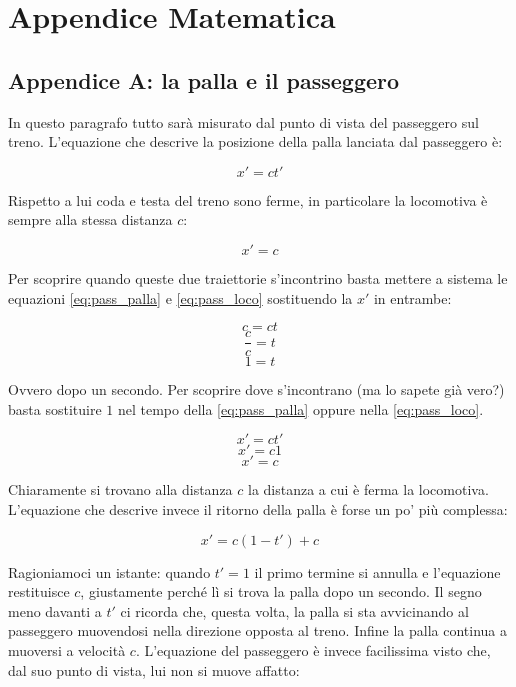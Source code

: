 ﻿\appendix


\chapter{Appendice Matematica}

\section{Appendice A: la palla e il passeggero}

In questo paragrafo tutto sarà misurato dal punto di vista del passeggero sul treno. L'equazione che descrive la posizione della palla lanciata dal passeggero è:

\begin{equation} \label{eq:pass_palla} 
  x'= ct'
\end{equation}

Rispetto a lui coda e testa del treno sono ferme, in particolare la locomotiva è sempre alla stessa distanza $c$:

\begin{equation} \label{eq:pass_loco} 
  x'= c
\end{equation}

Per scoprire quando queste due traiettorie s'incontrino basta mettere a sistema le equazioni \ref{eq:pass_palla} e \ref{eq:pass_loco} sostituendo la $x'$ in entrambe:

$$ c = ct $$
$$ \frac{c}{c} = t $$
$$ 1 = t $$

Ovvero dopo un secondo. Per scoprire dove s'incontrano (ma lo sapete già vero?) basta sostituire $1$ nel tempo della \ref{eq:pass_palla} oppure nella \ref{eq:pass_loco}. 

$$ x'= ct' $$
$$ x'= c1 $$
$$ x'= c $$

Chiaramente si trovano alla distanza $c$ la distanza a cui è ferma la locomotiva. L'equazione che descrive invece il ritorno della palla è forse un po' più complessa:

\begin{equation} \label{eq:pass_palla_back} 
   x' = c(1-t') + c
\end{equation}

Ragioniamoci un istante: quando $t'=1$ il primo termine si annulla e l'equazione restituisce $c$, giustamente perché lì si trova la palla dopo un secondo. Il segno meno davanti a $t'$ ci ricorda che, questa volta, la palla si sta avvicinando al passeggero muovendosi nella direzione opposta al treno. Infine la palla continua a muoversi a velocità $c$. L'equazione del passeggero è invece facilissima visto che, dal suo punto di vista, lui non si muove affatto:

